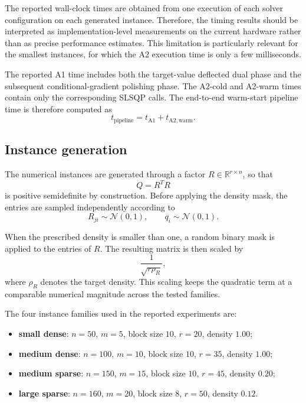 \documentclass[12pt]{article}
\begin{document}
The reported wall-clock times are obtained from one execution of each
solver configuration on each generated instance. Therefore, the timing
results should be interpreted as implementation-level measurements on
the current hardware rather than as precise performance estimates.
This limitation is particularly relevant for the smallest instances,
for which the A2 execution time is only a few milliseconds.

The reported A1 time includes both the target-value deflected dual
phase and the subsequent conditional-gradient polishing phase. The
A2-cold and A2-warm times contain only the corresponding SLSQP calls.
The end-to-end warm-start pipeline time is therefore computed as
\[
t_{\mathrm{pipeline}}
=
t_{\mathrm{A1}}+t_{\mathrm{A2,warm}}.
\]

\subsection{Instance generation}

The numerical instances are generated through a factor
$R\in\mathbb{R}^{r\times n}$, so that
\[
Q=R^TR
\]
is positive semidefinite by construction. Before applying the density
mask, the entries are sampled independently according to
\[
R_{ji}\sim\mathcal{N}(0,1),
\qquad
q_i\sim\mathcal{N}(0,1).
\]

When the prescribed density is smaller than one, a random binary mask
is applied to the entries of $R$. The resulting matrix is then scaled
by
\[
\frac{1}{\sqrt{r\rho_R}},
\]
where $\rho_R$ denotes the target density. This scaling keeps the
quadratic term at a comparable numerical magnitude across the tested
families.

The four instance families used in the reported experiments are:
\begin{itemize}
    \item \textbf{small dense}: $n=50$, $m=5$, block size $10$,
    $r=20$, density $1.00$;

    \item \textbf{medium dense}: $n=100$, $m=10$, block size $10$,
    $r=35$, density $1.00$;

    \item \textbf{medium sparse}: $n=150$, $m=15$, block size $10$,
    $r=45$, density $0.20$;

    \item \textbf{large sparse}: $n=160$, $m=20$, block size $8$,
    $r=50$, density $0.12$.
\end{itemize}
\end{document}
